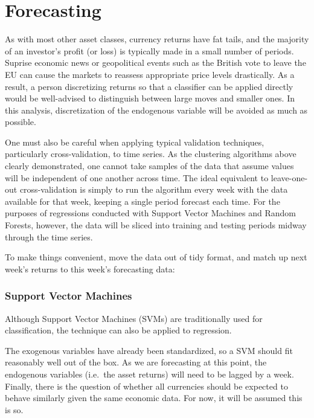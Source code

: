 \documentclass[]{article}
\begin{document}
\section{Forecasting}\label{forecasting}

As with most other asset classes, currency returns have fat tails, and
the majority of an investor's profit (or loss) is typically made in a
small number of periods. Suprise economic news or geopolitical events
such as the British vote to leave the EU can cause the markets to
reassess appropriate price levels drastically. As a result, a person
discretizing returns so that a classifier can be applied directly would
be well-advised to distinguish between large moves and smaller ones. In
this analysis, discretization of the endogenous variable will be avoided
as much as possible.

One must also be careful when applying typical validation techniques,
particularly cross-validation, to time series. As the clustering
algorithms above clearly demonstrated, one cannot take samples of the
data that assume values will be independent of one another across time.
The ideal equivalent to leave-one-out cross-validation is simply to run
the algorithm every week with the data available for that week, keeping
a single period forecast each time. For the purposes of regressions
conducted with Support Vector Machines and Random Forests, however, the
data will be sliced into training and testing periods midway through the
time series.

To make things convenient, move the data out of tidy format, and match
up next week's returns to this week's forecasting data:

\subsubsection{Support Vector Machines}\label{support-vector-machines}

Although Support Vector Machines (SVMs) are traditionally used for
classification, the technique can also be applied to regression.

The exogenous variables have already been standardized, so a SVM should
fit reasonably well out of the box. As we are forecasting at this point,
the endogenous variables (i.e.~the asset returns) will need to be lagged
by a week. Finally, there is the question of whether all currencies
should be expected to behave similarly given the same economic data. For
now, it will be assumed this is so.
\end{document}
